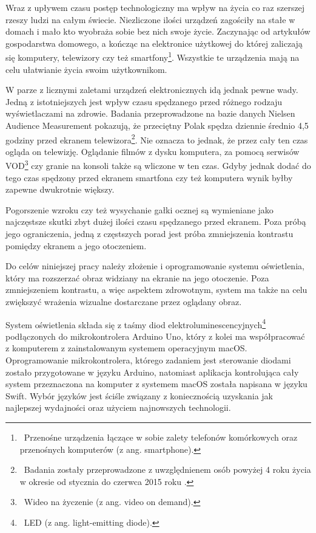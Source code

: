 \documentclass[12pt]{report}
\begin{document}
Wraz z upływem czasu postęp technologiczny ma wpływ na życia co raz szerszej rzeszy ludzi na całym świecie. Niezliczone ilości urządzeń zagościły na stałe w domach i mało kto wyobraża sobie bez nich swoje życie. Zaczynając od artykułów gospodarstwa domowego, a kończąc na elektronice użytkowej do której zaliczają się komputery, telewizory czy też smartfony\footnote{~Przenośne urządzenia łączące w sobie zalety telefonów komórkowych oraz przenośnych komputerów (z ang. smartphone).}. Wszystkie te urządzenia mają na celu ułatwianie życia swoim użytkownikom.

W parze z licznymi zaletami urządzeń elektronicznych idą jednak pewne wady. Jedną z istotniejszych jest wpływ czasu spędzanego przed różnego rodzaju wyświetlaczami na zdrowie. Badania przeprowadzone na bazie danych Nielsen Audience Measurement pokazują, że przeciętny Polak spędza dziennie średnio 4,5 godziny przed ekranem telewizora\footnote{~Badania zostały przeprowadzone z uwzględnienem osób powyżej 4 roku życia w okresie od stycznia do czerwca 2015 roku \cite{czasprzedtv}.}. Nie oznacza to jednak, że przez cały ten czas ogląda on telewizję. Oglądanie filmów z dysku komputera, za pomocą serwisów VOD\footnote{~Wideo na życzenie (z ang. video on demand).} czy granie na konsoli także są wliczone w ten czas. Gdyby jednak dodać do tego czas spędzony przed ekranem smartfona czy też komputera wynik byłby zapewne dwukrotnie większy.


Pogorszenie wzroku czy też wysychanie gałki ocznej są wymieniane jako naj\-częstsze skutki zbyt dużej ilości czasu spędzanego przed ekranem. Poza próbą jego ograniczenia, jedną z częstszych porad jest próba zmniejszenia kontrastu pomiędzy ekranem a jego otoczeniem.

Do celów niniejszej pracy należy złożenie i oprogramowanie systemu oświetlenia, który ma rozszerzać obraz widziany na ekranie na jego otoczenie. Poza zmniejszeniem kontrastu, a więc aspektem zdrowotnym, system ma także na celu zwiększyć wrażenia wizualne dostarczane przez oglądany obraz.


System oświetlenia składa się z taśmy diod elektroluminescencyjnych\footnote{~LED (z ang. light-emitting diode).} pod\-łączonych do mikrokontrolera Arduino Uno, który z kolei ma współpracować z komputerem z zainstalowanym systemem operacyjnym macOS. Oprogramowanie mikrokontrolera, którego zadaniem jest sterowanie diodami zostało przygotowane w języku Arduino, natomiast aplikacja kontrolująca cały system przeznaczona na komputer z systemem macOS została napisana w języku Swift. Wybór języków jest ściśle związany z koniecznością uzyskania jak najlepszej wydajności oraz użyciem najnowszych technologii.
\end{document}
